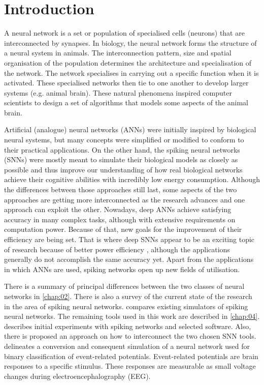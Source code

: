 \chapter{Introduction} \label{chap:01}

A neural network is a set or population of specialised cells (neurons) that are interconnected by synapses. In biology, the neural network forms the structure of a neural system in animals. The interconnection pattern, size and spatial organisation of the population determines the architecture and specialisation of the network. The network specialises in carrying out a specific function when it is activated. These specialised networks then tie to one another to develop larger systems (e.g. animal brain). These natural phenomena inspired computer scientists to design a set of algorithms that models some aspects of the animal brain.

Artificial (analogue) neural networks (ANNs) were initially inspired by biological neural systems, but many concepts were simplified or modified to conform to their practical applications. On the other hand, the spiking neural networks (SNNs) were mostly meant to simulate their biological models as closely as possible and thus improve our understanding of how real biological networks achieve their cognitive abilities with incredibly low energy consumption. Although the differences between those approaches still last, some aspects of the two approaches are getting more interconnected as the research advances and one approach can exploit the other. Nowadays, deep ANNs achieve satisfying accuracy in many complex tasks, although with extensive requirements on computation power. Because of that, new goals for the improvement of their efficiency are being set. That is where deep SNNs appear to be an exciting topic of research because of better power efficiency \cite{caoSpikingDeepConvolutional2015, tavanaeiDeepLearningSpiking2019}, although the applications generally do not accomplish the same accuracy yet. Apart from the applications in which ANNs are used, spiking networks open up new fields of utilisation. \par
There is a summary of principal differences between the two classes of neural networks in \cref{chap:02}. There is also a survey of the current state of the research in the area of spiking neural networks.  compares existing simulators of spiking neural networks. The remaining tools used in this work are described in \cref{chap:04}.  describes initial experiments with spiking networks and selected software. Also, there is proposed an approach on how to interconnect the two chosen SNN tools.  delineates a conversion and consequent simulation of a neural network used for binary classification of event-related potentials. Event-related potentials are brain responses to a specific stimulus. These responses are measurable as small voltage changes during electroencephalography (EEG).





